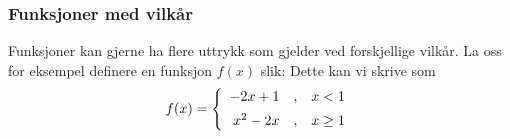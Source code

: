 \subsubsection{Funksjoner med vilkår}
Funksjoner kan gjerne ha flere uttrykk som gjelder ved forskjellige vilkår. La oss for eksempel definere en funksjon $ f(x) $ slik:
Dette kan vi skrive som
\begin{equation*}f(x)= \left\lbrace{
		\begin{array}{rcr}
			-2x+1 &,&x<1 \br
			x^2-2x   &,& x\geq 1
		\end{array}
	}\right. \label{fsplit}
\end{equation*}

